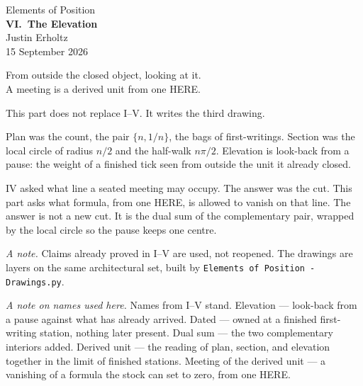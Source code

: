 \documentclass[10pt,a4paper]{article}
\theoremstyle{plain}
\theoremstyle{definition}
\begin{document}
\begin{center}
\vspace*{2.2em}
{\large Elements of Position}\\[1.6em]
{\LARGE\bfseries VI.\ The Elevation}\\[2.2em]
{\normalsize Justin Erholtz}\\[0.35em]
{\small 15 September 2026}
\end{center}

\vspace{2.4em}

\begin{center}
{\large From outside the closed object, looking at it.}\\[0.55em]
{\large A meeting is a derived unit from one HERE.}
\end{center}

\vspace{1.8em}

\noindent
This part does not replace I--V.
It writes the third drawing.

Plan was the count, the pair $\{n,1/n\}$, the bags of first-writings.
Section was the local circle of radius $n/2$ and the half-walk $n\pi/2$.
Elevation is look-back from a pause: the weight of a finished tick seen from outside the unit it already closed.

IV asked what line a seated meeting may occupy.
The answer was the cut.
This part asks what formula, from one HERE, is allowed to vanish on that line.
The answer is not a new cut.
It is the dual sum of the complementary pair, wrapped by the local circle so the pause keeps one centre.

\vspace{1.4em}

\noindent
\textit{A note.}
Claims already proved in I--V are used, not reopened.
The drawings are layers on the same architectural set, built by \texttt{Elements of Position - Drawings.py}.

\vspace{0.9em}
\noindent
\textit{A note on names used here.}
Names from I--V stand.
Elevation --- look-back from a pause against what has already arrived.
Dated --- owned at a finished first-writing station, nothing later present.
Dual sum --- the two complementary interiors added.
Derived unit --- the reading of plan, section, and elevation together in the limit of finished stations.
Meeting of the derived unit --- a vanishing of a formula the stock can set to zero, from one HERE.
\end{document}
